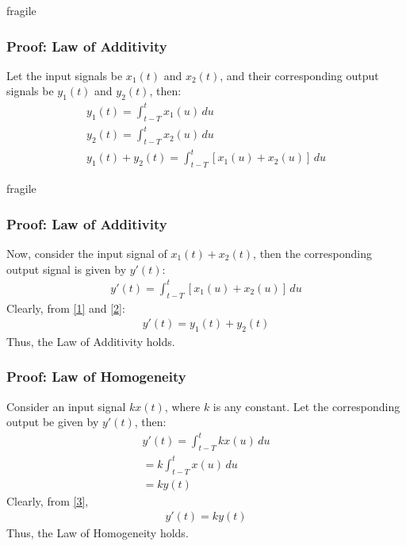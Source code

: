 \documentclass{beamer}
\begin{document}
\begin{frame}{fragile}
\frametitle{Proof: Law of Additivity}

\begin{flushleft}
Let the input signals be $x_1(t)$ and $x_2(t)$, and their corresponding output signals be $y_1(t)$ and $y_2(t)$, then:
\begin{align}
    y_1(t) = \int_{t-T}^tx_1(u)\,du\\
    y_2(t) = \int_{t-T}^tx_2(u)\,du\\
    y_1(t) + y_2(t) = \int_{t-T}^t[x_1(u) + x_2(u)]\,du
    \label{1}
\end{align}
\end{flushleft}

\end{frame}
\begin{frame}{fragile}
\frametitle{Proof: Law of Additivity}

\begin{flushleft}
Now, consider the input signal of $x_1(t) + x_2(t)$, then the corresponding output signal is given by $y'(t)$:
\begin{align}
    y'(t) = \int_{t-T}^t[x_1(u) + x_2(u)]\,du
    \label{2}
\end{align}
Clearly, from \eqref{1} and \eqref{2}:
\begin{align}
    y'(t) = y_1(t) + y_2(t)
\end{align}
Thus, the Law of Additivity holds.\\

\end{flushleft}
    
\end{frame}

\begin{frame}
    \frametitle{Proof: Law of Homogeneity}
    \begin{flushleft}
      Consider an input signal $kx(t)$, where $k$ is any constant. Let the corresponding output be given by $y'(t)$, then:
\begin{align}
    y'(t) = \int_{t-T}^t kx(u)\,du\\
    = k\int_{t-T}^t x(u)\,du\\
     = ky(t)
     \label{3}
\end{align}
Clearly, from \eqref{3},
\begin{align}
    y'(t) = ky(t)
\end{align}
Thus, the Law of Homogeneity holds.\\
  \end{flushleft}
\end{frame}
\end{document}
